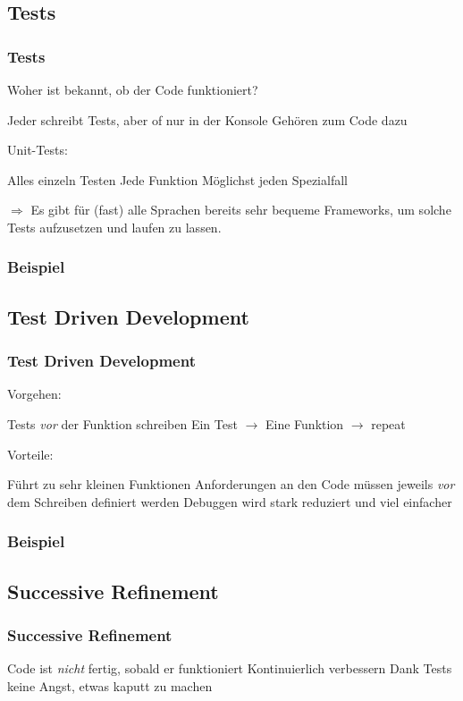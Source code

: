 \documentclass{beamer}
\begin{document}
\subsection{Tests}
\begin{frame}
    \frametitle{Tests}
    Woher ist bekannt, ob der Code funktioniert?\pause

    \begin{outline}
        \1 Jeder schreibt Tests, aber of nur in der Konsole
        \1 Gehören zum Code dazu
    \end{outline} \pause

    Unit-Tests:
    \begin{outline}
        \1 Alles einzeln Testen
            \2 Jede Funktion
            \2 Möglichst jeden Spezialfall
    \end{outline}
    $\Rightarrow$ Es gibt für (fast) alle Sprachen bereits sehr bequeme
    Frameworks, um solche Tests aufzusetzen und laufen zu lassen.
\end{frame}
\begin{frame}
    \frametitle{Beispiel}
\end{frame}
\subsection{Test Driven Development}
\begin{frame}
    \frametitle{Test Driven Development}
    Vorgehen:

    \begin{outline}
        \1 Tests \emph{vor} der Funktion schreiben
        \1 Ein Test $\rightarrow$ Eine Funktion $\rightarrow$ repeat
    \end{outline}\pause

    Vorteile:

    \begin{outline}
        \1 Führt zu sehr kleinen Funktionen
        \1 Anforderungen an den Code müssen jeweils \emph{vor} dem Schreiben
        definiert werden
        \1 Debuggen wird stark reduziert und viel einfacher
    \end{outline}
\end{frame}
\begin{frame}
    \frametitle{Beispiel}
\end{frame}

\subsection{Successive Refinement}
\begin{frame}
    \frametitle{Successive Refinement}
    \begin{outline}
        \1 Code ist \emph{nicht} fertig, sobald er funktioniert
        \1 Kontinuierlich verbessern
        \1 Dank Tests keine Angst, etwas kaputt zu machen
    \end{outline}
\end{frame}
\end{document}
